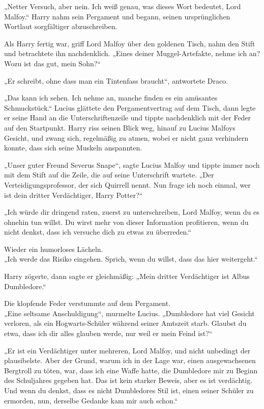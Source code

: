 {„Netter Versuch, aber nein. Ich weiß genau, was dieses Wort bedeutet, Lord Malfoy.“ Harry nahm sein Pergament und begann, seinen ursprünglichen Wortlaut sorgfältiger abzuschreiben.

Als Harry fertig war, griff Lord Malfoy über den goldenen Tisch, nahm den Stift und betrachtete ihn nachdenklich. „Eines deiner Muggel-Artefakte, nehme ich an? Wozu ist das gut, mein Sohn?“

„Er schreibt, ohne dass man ein Tintenfass braucht“, antwortete Draco.

„Das kann ich sehen. Ich nehme an, manche finden es ein amüsantes Schmuckstück.“ Lucius glättete den Pergamentvertrag auf dem Tisch, dann legte er seine Hand an die Unterschriftenzeile und tippte nachdenklich mit der Feder auf den Startpunkt. Harry riss seinen Blick weg, hinauf zu Lucius Malfoys Gesicht, und zwang sich, regelmäßig zu atmen, wobei er nicht ganz verhindern konnte, dass sich seine Muskeln anspannten.

„Unser guter Freund Severus Snape“, sagte Lucius Malfoy und tippte immer noch mit dem Stift auf die Zeile, die auf seine Unterschrift wartete. „Der Verteidigungsprofessor, der sich Quirrell nennt. Nun frage ich noch einmal, wer ist dein dritter Verdächtiger, Harry Potter?“

„Ich würde dir dringend raten, zuerst zu unterschreiben, Lord Malfoy, wenn du es ohnehin tun willst. Du wirst mehr von dieser Information profitieren, wenn du nicht denkst, dass ich versuche dich zu etwas zu überreden.“

Wieder ein humorloses Lächeln.\\ „Ich werde das Risiko eingehen. Sprich, wenn du willst, dass das hier weitergeht.“

Harry zögerte, dann sagte er gleichmäßig: „Mein dritter Verdächtiger ist Albus Dumbledore.“

Die klopfende Feder verstummte auf dem Pergament.\\ „Eine seltsame Anschuldigung“, murmelte Lucius. „Dumbledore hat viel Gesicht verloren, als ein Hogwarts-Schüler während seiner Amtszeit starb. Glaubst du etwa, dass ich dir alles glauben werde, nur weil er mein Feind ist?“

„Er ist ein Verdächtiger unter mehreren, Lord Malfoy, und nicht unbedingt der plausibelste. Aber der Grund, warum ich in der Lage war, einen ausgewachsenen Bergtroll zu töten, war, dass ich eine Waffe hatte, die Dumbledore mir zu Beginn des Schuljahres gegeben hat. Das ist kein starker Beweis, aber es ist verdächtig. Und wenn du denkst, dass es nicht Dumbledores Stil ist, einen seiner Schüler zu ermorden, nun, derselbe Gedanke kam mir auch schon.“

}
